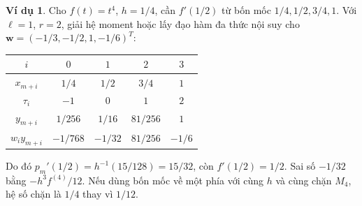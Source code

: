 \documentclass[12pt,a4paper,oneside]{book}
\numberwithin{algorithm}{chapter}
\theoremstyle{definition}
\newtheorem{vidu}{Ví dụ}[chapter]
\begin{document}
\begin{vidu}
Cho $f(t)=t^4$, $h=1/4$, cần $f'(1/2)$ từ bốn mốc $1/4,1/2,3/4,1$. Với $\ell=1$, $r=2$, giải hệ moment hoặc lấy đạo hàm đa thức nội suy cho $\boldsymbol w=(-1/3,-1/2,1,-1/6)^T$:
\begin{center}
\begin{tabular}{c|cccc}
\toprule
$i$ & $0$ & $1$ & $2$ & $3$\\
\midrule
$x_{m+i}$ & $1/4$ & $1/2$ & $3/4$ & $1$\\
$\tau_i$ & $-1$ & $0$ & $1$ & $2$\\
$y_{m+i}$ & $1/256$ & $1/16$ & $81/256$ & $1$\\
$w_i y_{m+i}$ & $-1/768$ & $-1/32$ & $81/256$ & $-1/6$\\
\bottomrule
\end{tabular}\end{center}
Do đó $p_m'(1/2)=h^{-1}(15/128)=15/32$, còn $f'(1/2)=1/2$. Sai số $-1/32$ bằng $-h^3 f^{(4)}/12$. Nếu dùng bốn mốc về một phía với cùng $h$ và cùng chặn $M_4$, hệ số chặn là $1/4$ thay vì $1/12$.
\end{vidu}
\end{document}
